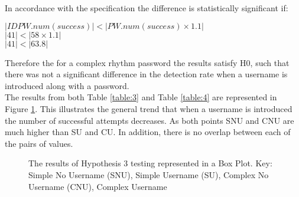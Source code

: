 \documentclass{article}
\begin{document}
In accordance with the specification the difference is statistically significant if: 
\begin{center}
    $ |IDPW.num(success)| < |PW.num(success) \times 1.1|$ \\
    $ |41| < |58 \times 1.1| $ \\
    $ |41| < |63.8| $
\end{center} 

Therefore the for a complex rhythm password the results satisfy H0, such that there was not a significant difference in the detection rate when a username is introduced along with a password. \\

The results from both Table \ref{table:3} and Table \ref{table:4} are represented in Figure \ref{fig:boxPlotHyp3}. This illustrates the general trend that when a username is introduced the number of successful attempts decreases. As both points SNU and CNU are much higher than SU and CU. In addition, there is no overlap between each of the pairs of values.   

\begin{figure} [H]
    \centering
    \caption{The results of Hypothesis 3 testing represented in a Box Plot. Key: Simple No Username (SNU), Simple Username (SU), Complex No Username (CNU), Complex Username}
    \label{fig:boxPlotHyp3}
\end{figure}
\end{document}
